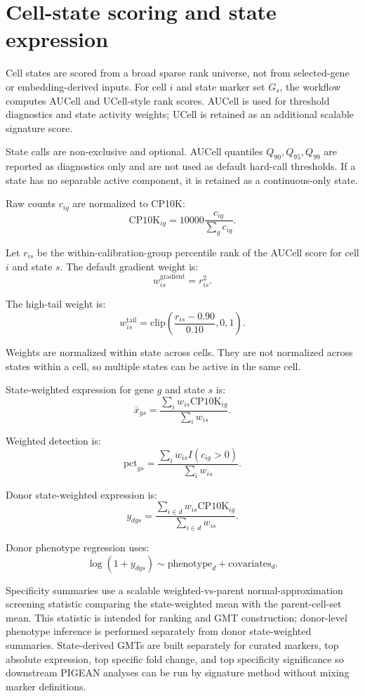 \section{Cell-state scoring and state expression}

Cell states are scored from a broad sparse rank universe, not from selected-gene
or embedding-derived inputs. For cell \(i\) and state marker set \(G_s\), the
workflow computes AUCell and UCell-style rank scores. AUCell is used for
threshold diagnostics and state activity weights; UCell is retained as an
additional scalable signature score.

State calls are non-exclusive and optional. AUCell quantiles
\(Q_{90}, Q_{95}, Q_{99}\) are reported as diagnostics only and are not used as
default hard-call thresholds. If a state has no separable active component, it
is retained as a continuous-only state.

Raw counts \(c_{ig}\) are normalized to CP10K:
\[
\mathrm{CP10K}_{ig} = 10000 \frac{c_{ig}}{\sum_g c_{ig}}.
\]

Let \(r_{is}\) be the within-calibration-group percentile rank of the AUCell
score for cell \(i\) and state \(s\). The default gradient weight is:
\[
w^{\mathrm{gradient}}_{is} = r_{is}^2.
\]

The high-tail weight is:
\[
w^{\mathrm{tail}}_{is} =
\mathrm{clip}\left(\frac{r_{is} - 0.90}{0.10}, 0, 1\right).
\]

Weights are normalized within state across cells. They are not normalized across
states within a cell, so multiple states can be active in the same cell.

State-weighted expression for gene \(g\) and state \(s\) is:
\[
\bar{x}_{gs} =
\frac{\sum_i w_{is}\mathrm{CP10K}_{ig}}{\sum_i w_{is}}.
\]

Weighted detection is:
\[
\mathrm{pct}_{gs} =
\frac{\sum_i w_{is} I(c_{ig} > 0)}{\sum_i w_{is}}.
\]

Donor state-weighted expression is:
\[
y_{dgs} =
\frac{\sum_{i \in d} w_{is}\mathrm{CP10K}_{ig}}
{\sum_{i \in d} w_{is}}.
\]

Donor phenotype regression uses:
\[
\log(1 + y_{dgs}) \sim \mathrm{phenotype}_d + \mathrm{covariates}_d.
\]

Specificity summaries use a scalable weighted-vs-parent normal-approximation
screening statistic comparing the state-weighted mean with the parent-cell-set
mean. This statistic is intended for ranking and GMT construction; donor-level
phenotype inference is performed separately from donor state-weighted summaries.
State-derived GMTs are built separately for curated markers, top absolute
expression, top specific fold change, and top specificity significance so
downstream PIGEAN analyses can be run by signature method without mixing marker
definitions.
